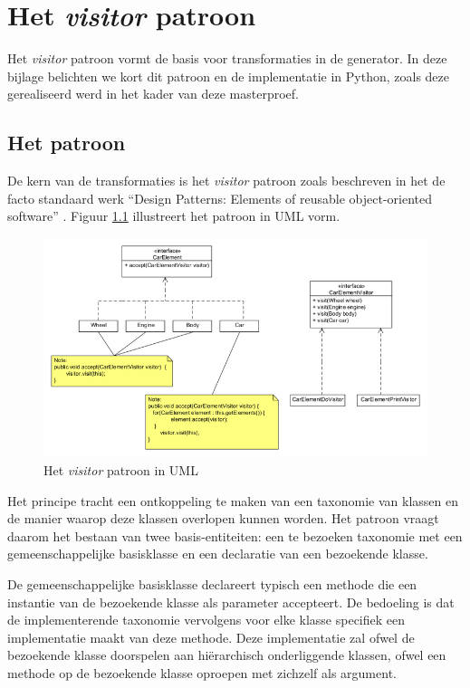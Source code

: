 
\chapter{Het \emph{visitor} patroon}
\label{appendix:visitor}

Het \emph{visitor} patroon vormt de basis voor transformaties in de generator.
In deze bijlage belichten we kort dit patroon en de implementatie in Python,
zoals deze gerealiseerd werd in het kader van deze masterproef.

\section{Het patroon}
\label{section:devel-visitor-pattern}

De kern van de transformaties is het \emph{visitor} patroon zoals beschreven in
het de facto standaard werk ``Design Patterns: Elements of reusable
object-oriented software'' \citep{gamma1994design}. Figuur \ref{fig:visitor}
illustreert het patroon in UML vorm.

\begin{figure}[ht]
  \centering
  \includegraphics[width=0.7\linewidth]{resources/visitor.png}
  \caption{Het \emph{visitor} patroon in UML}
  \label{fig:visitor}
\end{figure}

Het principe tracht een ontkoppeling te maken van een taxonomie van klassen en
de manier waarop deze klassen overlopen kunnen worden. Het patroon vraagt
daarom het bestaan van twee basis-entiteiten: een te bezoeken taxonomie met een
gemeenschappelijke basisklasse en een declaratie van een bezoekende klasse.

De gemeenschappelijke basisklasse declareert typisch een methode 
die een instantie van de bezoekende klasse als parameter accepteert. De
bedoeling is dat de implementerende taxonomie vervolgens voor elke klasse
specifiek een implementatie maakt van deze methode. Deze implementatie zal
ofwel de bezoekende klasse doorspelen aan hi\"erarchisch onderliggende klassen,
ofwel een  methode op de bezoekende klasse oproepen met zichzelf als
argument.

